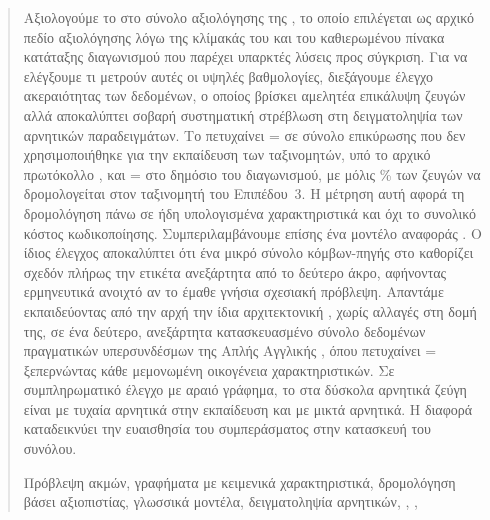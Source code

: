\begin{abstract}
    Αξιολογούμε το  στο σύνολο αξιολόγησης  της
    , το οποίο επιλέγεται ως αρχικό πεδίο αξιολόγησης λόγω της
    κλίμακάς του και του καθιερωμένου πίνακα κατάταξης διαγωνισμού που παρέχει
    υπαρκτές λύσεις προς σύγκριση.
    Για να ελέγξουμε τι μετρούν αυτές οι υψηλές βαθμολογίες, διεξάγουμε έλεγχο
    ακεραιότητας των δεδομένων, ο οποίος βρίσκει αμελητέα επικάλυψη ζευγών αλλά
    αποκαλύπτει σοβαρή συστηματική στρέβλωση στη δειγματοληψία των αρνητικών παραδειγμάτων.
    Το  πετυχαίνει  = \CascadeValFone{}
    σε σύνολο επικύρωσης που δεν χρησιμοποιήθηκε για την εκπαίδευση των ταξινομητών,
    υπό το αρχικό πρωτόκολλο , και
     = \KaggleBaselinePublic{} στο δημόσιο  του
    διαγωνισμού, με μόλις \TierThreePct\% των ζευγών να δρομολογείται στον
    ταξινομητή του Επιπέδου~3.
    Η μέτρηση αυτή αφορά τη δρομολόγηση πάνω σε
    ήδη υπολογισμένα χαρακτηριστικά και όχι το συνολικό κόστος κωδικοποίησης.
    Συμπεριλαμβάνουμε επίσης ένα μοντέλο αναφοράς
    .
    Ο ίδιος έλεγχος αποκαλύπτει ότι ένα μικρό σύνολο κόμβων-πηγής
    στο  καθορίζει σχεδόν πλήρως την ετικέτα ανεξάρτητα από
    το δεύτερο άκρο, αφήνοντας ερμηνευτικά ανοιχτό αν το 
    έμαθε γνήσια σχεσιακή πρόβλεψη.
    Απαντάμε εκπαιδεύοντας από την αρχή την ίδια αρχιτεκτονική ,
    χωρίς αλλαγές στη δομή της, σε ένα δεύτερο, ανεξάρτητα κατασκευασμένο
    σύνολο δεδομένων πραγματικών υπερσυνδέσμων της Απλής Αγγλικής , όπου
    πετυχαίνει  = \WfCascadeFone{} ξεπερνώντας κάθε
    μεμονωμένη οικογένεια χαρακτηριστικών.
    Σε συμπληρωματικό έλεγχο με αραιό γράφημα, το  στα δύσκολα
    αρνητικά ζεύγη είναι \WsRandomHardCascadeFone{} με τυχαία αρνητικά στην
    εκπαίδευση και \WsMixedHardCascadeFone{} με μικτά αρνητικά. Η διαφορά
    καταδεικνύει την ευαισθησία του συμπεράσματος στην κατασκευή του συνόλου.

    \begin{keywords}
        Πρόβλεψη ακμών, γραφήματα με κειμενικά χαρακτηριστικά, δρομολόγηση βάσει αξιοπιστίας,
        γλωσσικά μοντέλα, δειγματοληψία αρνητικών, ,
        , 
    \end{keywords}
\end{abstract}

